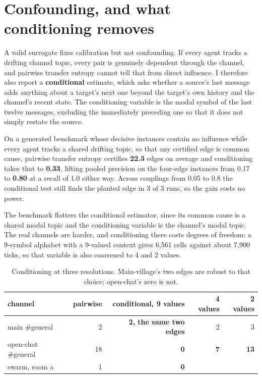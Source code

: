 \documentclass[10pt]{article}
\begin{document}
\section{Confounding, and what conditioning removes}

A valid surrogate fixes calibration but not confounding. If every agent tracks a drifting channel
topic, every pair is genuinely dependent through the channel, and pairwise transfer entropy cannot
tell that from direct influence. I therefore also report a \textbf{conditional} estimate, which asks
whether a source's last message adds anything about a target's next one beyond the target's own
history and the channel's recent state. The conditioning variable is the modal symbol of the last
twelve messages, excluding the immediately preceding one so that it does not simply restate the
source.

On a generated benchmark whose decisive instances contain no influence while every agent tracks a
shared drifting topic, so that any certified edge is common cause, pairwise transfer entropy
certifies \textbf{22.3} edges on average and conditioning takes that to \textbf{0.33}, lifting pooled
precision on the four-edge instances from 0.17 to \textbf{0.80} at a recall of 1.0 either way. Across
couplings from 0.05 to 0.8 the conditional test still finds the planted edge in 3 of 3 runs, so the
gain costs no power.

The benchmark flatters the conditional estimator, since its common cause is a shared modal topic and
the conditioning variable is the channel's modal topic. The real channels are harder, and
conditioning there costs degrees of freedom: a 9-symbol alphabet with a 9-valued context gives 6,561
cells against about 7,900 ticks, so that variable is also coarsened to 4 and 2 values.

\begin{table}[h]
\centering
\begin{tabular}{lrrrr}
\toprule
channel & pairwise & conditional, 9 values & 4 values & 2 values \\
\midrule
main \#general      & 2  & \textbf{2, the same two edges} & 2 & 3 \\
open-chat \#general & 18 & \textbf{0} & \textbf{7} & \textbf{13} \\
swarm, room a       & 1  & \textbf{0} & & \\
\bottomrule
\end{tabular}
\caption{Conditioning at three resolutions. Main-village's two edges are robust to that choice;
open-chat's zero is not.}
\end{table}
\end{document}
